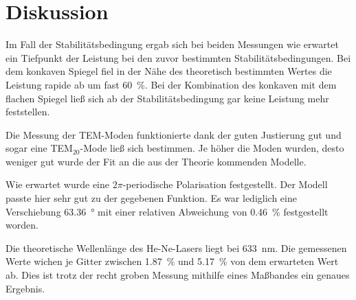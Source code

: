 \section{Diskussion}
\label{sec:Diskussion}

Im Fall der Stabilitätsbedingung ergab sich bei beiden Messungen wie erwartet ein Tiefpunkt der Leistung bei den zuvor bestimmten Stabilitätsbedingungen. 
Bei dem konkaven Spiegel fiel in der Nähe des theoretisch bestimmten Wertes die Leistung rapide ab um fast \SI{60}{\percent}.
Bei der Kombination des konkaven mit dem flachen Spiegel ließ sich ab der Stabilitätsbedingung gar keine Leistung mehr feststellen. 

Die Messung der TEM-Moden funktionierte dank der guten Justierung gut und sogar eine TEM$_{20}$-Mode ließ sich bestimmen. 
Je höher die Moden wurden, desto weniger gut wurde der Fit an die aus der Theorie kommenden Modelle.

Wie erwartet wurde eine $2\pi$-periodische Polarisation festgestellt. Der Modell passte hier sehr gut zu der gegebenen Funktion. 
Es war lediglich eine Verschiebung \SI{63.36}{\degree} mit einer relativen Abweichung von \SI{0.46}{\percent} festgestellt worden. 

Die theoretische Wellenlänge des He-Ne-Lasers liegt bei \SI{633}{\nano\meter}. Die gemessenen Werte wichen je Gitter zwischen \SI{1.87}{\percent} und \SI{5.17}{\percent} von dem erwarteten Wert ab. Dies ist trotz der recht groben Messung mithilfe eines Maßbandes ein genaues Ergebnis. 